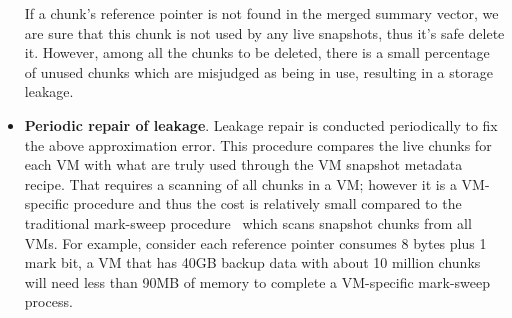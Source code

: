 \begin{itemize}
If a chunk's reference pointer is not found in the merged summary vector, we are sure that
this chunk is not used by any live snapshots, thus it's safe delete it. 
However, among all the chunks to be deleted, 
there is a small percentage of unused chunks  which
are misjudged as  being in use, resulting in a storage leakage.


\item {\bf Periodic repair of leakage}.
Leakage repair is conducted periodically to fix the above approximation error.
This procedure compares the live chunks for each VM with what are truly used through the VM snapshot metadata recipe.
That requires a scanning of all chunks in a VM; however it is a VM-specific procedure and thus
the cost is relatively small compared to the traditional mark-sweep procedure~\cite{?} which scans snapshot 
chunks from all VMs.
For example,
consider each reference pointer consumes 8 bytes plus  1 mark bit, a VM that has 40GB backup data with about
10 million chunks will need less than 90MB of memory to complete a VM-specific mark-sweep process.
\end{itemize}




